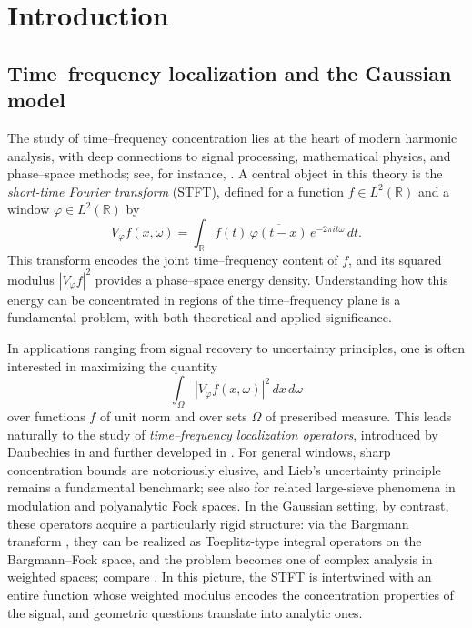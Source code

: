 \section{Introduction}

\subsection{Time--frequency localization and the Gaussian model}

The study of time--frequency concentration lies at the heart of modern harmonic analysis, with deep connections to signal processing, mathematical physics, and phase--space methods; see, for instance, \cite{Grochenig,Mallat,Folland}. A central object in this theory is the \emph{short-time Fourier transform} (STFT), defined for a function $f \in L^2(\mathbb R)$ and a window $\varphi \in L^2(\mathbb R)$ by
\[
V_\varphi f(x,\omega) = \int_{\mathbb R} f(t)\,\overline{\varphi(t-x)}\,e^{-2\pi i t \omega}\,dt.
\]
This transform encodes the joint time--frequency content of $f$, and its squared modulus $|V_\varphi f|^2$ provides a phase--space energy density. Understanding how this energy can be concentrated in regions of the time--frequency plane is a fundamental problem, with both theoretical and applied significance.

In applications ranging from signal recovery to uncertainty principles, one is often interested in maximizing the quantity
\[
\int_\Omega |V_\varphi f(x,\omega)|^2\,dx\,d\omega
\]
over functions $f$ of unit norm and over sets $\Omega$ of prescribed measure. This leads naturally to the study of \emph{time--frequency localization operators}, introduced by Daubechies in \cite{Daubechies} and further developed in \cite{Daubechies-Paul,Ramanathan-Topiwala-Weyl,Ramanathan-Topiwala-Spectrogram,Cordero-Grochenig,Boggiatto-Cordero-Grochenig,Bayer-Grochenig,Kisil-CrossToeplitz,Nicola-Tilli-2,Ramos-time-frequency}. For general windows, sharp concentration bounds are notoriously elusive, and Lieb's uncertainty principle \cite{Lieb} remains a fundamental benchmark; see also \cite{abreu2021donoho} for related large-sieve phenomena in modulation and polyanalytic Fock spaces. In the Gaussian setting, by contrast, these operators acquire a particularly rigid structure: via the Bargmann transform \cite{Bargmann}, they can be realized as Toeplitz-type integral operators on the Bargmann--Fock space, and the problem becomes one of complex analysis in weighted spaces; compare \cite{Berezin,Berger-Coburn-Symbol,Berger-Coburn,Berger-Coburn-Heat,Zhu,Grochenig,Folland}. In this picture, the STFT is intertwined with an entire function whose weighted modulus encodes the concentration properties of the signal, and geometric questions translate into analytic ones.

